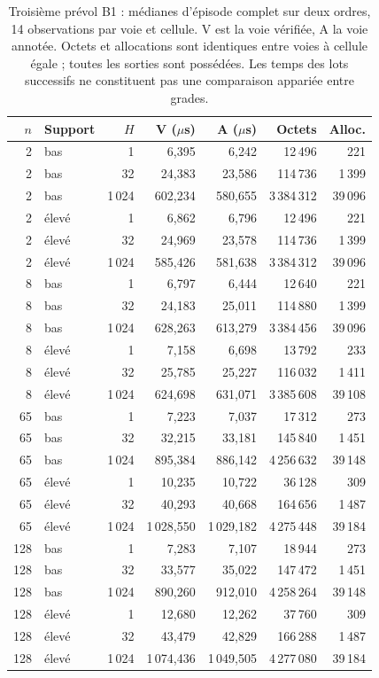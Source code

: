 \documentclass[11pt,a4paper]{article}
\begin{document}
\begin{table}[ht]
\centering\small
\begin{tabular}{@{}rlrrrrr@{}}
\toprule
$n$ & Support & $H$ & V (\(\mu\)s) & A (\(\mu\)s) & Octets & Alloc. \\
\midrule
2 & bas & 1 & 6,395 & 6,242 & 12\,496 & 221 \\
2 & bas & 32 & 24,383 & 23,586 & 114\,736 & 1\,399 \\
2 & bas & 1\,024 & 602,234 & 580,655 & 3\,384\,312 & 39\,096 \\
2 & élevé & 1 & 6,862 & 6,796 & 12\,496 & 221 \\
2 & élevé & 32 & 24,969 & 23,578 & 114\,736 & 1\,399 \\
2 & élevé & 1\,024 & 585,426 & 581,638 & 3\,384\,312 & 39\,096 \\
8 & bas & 1 & 6,797 & 6,444 & 12\,640 & 221 \\
8 & bas & 32 & 24,183 & 25,011 & 114\,880 & 1\,399 \\
8 & bas & 1\,024 & 628,263 & 613,279 & 3\,384\,456 & 39\,096 \\
8 & élevé & 1 & 7,158 & 6,698 & 13\,792 & 233 \\
8 & élevé & 32 & 25,785 & 25,227 & 116\,032 & 1\,411 \\
8 & élevé & 1\,024 & 624,698 & 631,071 & 3\,385\,608 & 39\,108 \\
65 & bas & 1 & 7,223 & 7,037 & 17\,312 & 273 \\
65 & bas & 32 & 32,215 & 33,181 & 145\,840 & 1\,451 \\
65 & bas & 1\,024 & 895,384 & 886,142 & 4\,256\,632 & 39\,148 \\
65 & élevé & 1 & 10,235 & 10,722 & 36\,128 & 309 \\
65 & élevé & 32 & 40,293 & 40,668 & 164\,656 & 1\,487 \\
65 & élevé & 1\,024 & 1\,028,550 & 1\,029,182 & 4\,275\,448 & 39\,184 \\
128 & bas & 1 & 7,283 & 7,107 & 18\,944 & 273 \\
128 & bas & 32 & 33,577 & 35,022 & 147\,472 & 1\,451 \\
128 & bas & 1\,024 & 890,260 & 912,010 & 4\,258\,264 & 39\,148 \\
128 & élevé & 1 & 12,680 & 12,262 & 37\,760 & 309 \\
128 & élevé & 32 & 43,479 & 42,829 & 166\,288 & 1\,487 \\
128 & élevé & 1\,024 & 1\,074,436 & 1\,049,505 & 4\,277\,080 & 39\,184 \\
\bottomrule
\end{tabular}
\caption{Troisième prévol B1 : médianes d'épisode complet sur deux
ordres, 14 observations par voie et cellule. V est la voie vérifiée,
A la voie annotée. Octets et allocations sont identiques entre voies
à cellule égale ; toutes les sorties sont possédées. Les temps des
lots successifs ne constituent pas une comparaison appariée entre
grades.}
\label{tab:b1horizons}
\end{table}
\end{document}
